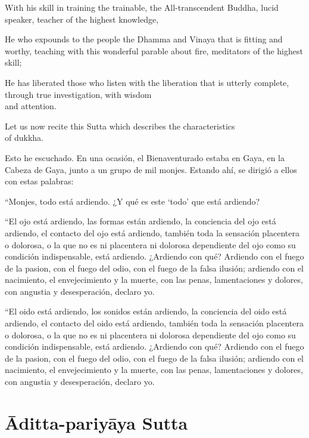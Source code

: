 \begin{leader}

With his skill in training the trainable, the All-transcendent Buddha,
lucid speaker, teacher of the highest knowledge,

He who expounds to the people the Dhamma and Vinaya that is fitting and
worthy, teaching with this wonderful parable about fire, meditators of
the highest skill;

He has liberated those who listen with the liberation that is utterly
complete, through true investigation, with wisdom\\ and attention.

Let us now recite this Sutta which describes the characteristics\\ of dukkha.

\end{leader}

Esto he escuchado. En una ocasión, el Bienaventurado estaba en Gaya, en la Cabeza de Gaya, junto a un grupo de mil monjes. Estando ahí, se dirigió a ellos con estas palabras:

“Monjes, todo está ardiendo. ¿Y qué es este ‘todo' que está ardiendo?

“El ojo está ardiendo, las formas están ardiendo, la conciencia del ojo está ardiendo, el contacto del ojo está ardiendo, también toda la sensación placentera o dolorosa, o la que no es ni placentera ni dolorosa dependiente del ojo como su condición indispensable, está ardiendo. ¿Ardiendo con qué? Ardiendo con el fuego de la pasion, con el fuego del odio, con el fuego de la falsa ilusión; ardiendo con el nacimiento, el envejecimiento y la muerte, con las penas, lamentaciones y dolores, con angustia y desesperación, declaro yo.


\enlargethispage{2\baselineskip}

“El oido está ardiendo, los sonidos están ardiendo, la conciencia del oido está ardiendo, el contacto del oido está ardiendo, también toda la sensación placentera o dolorosa, o la que no es ni placentera ni dolorosa dependiente del ojo como su condición indispensable, está ardiendo. ¿Ardiendo con qué? Ardiendo con el fuego de la pasion, con el fuego del odio, con el fuego de la falsa ilusión; ardiendo con el nacimiento, el envejecimiento y la muerte, con las penas, lamentaciones y dolores, con angustia y desesperación, declaro yo.




\chapterTocSubIndentTrue
\chapter{Āditta-pariyāya Sutta}

